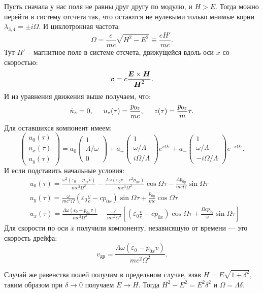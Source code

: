 Пусть сначала у нас поля не равны друг другу по модулю, и $H>E$. Тогда можно перейти в систему отсчета так, что остаются не нулевыми только мнимые корни $\lambda_{3,4} = \pm i \Omega$. И циклотронная частота: \begin{equation*}
	\Omega = \frac{e}{m c} \sqrt{H^2 - E^2} \equiv \frac{e H'}{m c}.
\end{equation*}
Тут $H'$ -- магнитное поле в системе отсчета, движущейся вдоль оси $x$ со скоростью:
\begin{equation*}
	\mbox{\boldmath $v$} = c \frac{\mbox{\boldmath $E$} \times \mbox{\boldmath $H$}}{\mbox{\boldmath $H$}^2}.
\end{equation*}
И из уравнения движения выше получаем, что:
\begin{equation*}
	\dot{u}_z = 0,
	\hspace{0.5 cm}
	u_z(\tau) = \frac{p_{0z}}{m c},
	\hspace{0.5 cm}
	z(\tau) = \frac{p_{0z}}{m}\tau.
\end{equation*}
Для оставшихся компонент имеем:
\begin{equation*}
	\begin{pmatrix}
		u_0 (\tau) \\ u_x(\tau) \\ u_y(\tau)
	\end{pmatrix}
	=
	a_0 \begin{pmatrix}
		1 \\ \Lambda / \omega \\ 0
	\end{pmatrix}
	+
	a_+ \begin{pmatrix}
		1 \\ \omega / \Lambda \\ i \Omega / \Lambda
	\end{pmatrix} e^{i \Omega \tau}
	+
	a_- \begin{pmatrix}
		1 \\ \omega/\Lambda \\ - i \Omega/\Lambda
	\end{pmatrix} e^{- i \Omega \tau}.
\end{equation*}
И если подставить начальные условия:
\begin{align*}
	&u_0(\tau) = \frac{\omega^2(\varepsilon_0 - p_{0x} v)}{m c^2 \Omega^2} - \frac{\Lambda \omega(\varepsilon_0 v - c^2 p_{0x})}{m c^3 \Omega^2} \cos \Omega \tau
	- \frac{\Lambda p_{0y}}{m c \Omega} \sin \Omega \tau \\
	&u_{y}(\tau) = \frac{\omega}{m c^2 \Omega}\left(\varepsilon_0 \frac{v}{c} - c p_{0x}\right) \sin \Omega \tau + \frac{p_{0y}}{m c} \cos \Omega \tau\\
	&u_x(\tau) = \frac{\Lambda \omega (\varepsilon_0 - p_{0x}v)}{m c^2 \Omega^2} - \frac{\omega^2}{m c^2 \Omega^2}\left[
	\left(\varepsilon_0 \frac{v}{c} - c p_{0x}\right)\cos \Omega \tau +\frac{\Omega c p_{0y}}{\omega}\sin \Omega \tau
	\right]
\end{align*}
Для скорости по оси $x$ получили компоненту, независящую от времени --- это скорость дрейфа:
\begin{equation*}
	v_{\text{др}} = \frac{\Lambda \omega (\varepsilon_0 - p_{0x}v)}{m c^2 \Omega^2}.
\end{equation*}

Случай же равенства полей получим в предельном случае, взяв $H = E \sqrt{1 + \delta^2}$, таким образом при $\delta \to 0$ получаем $E \to H$.
Тогда $H^2 - E^2 = E^2 \delta^2$ и $\Omega = \Lambda \delta$.